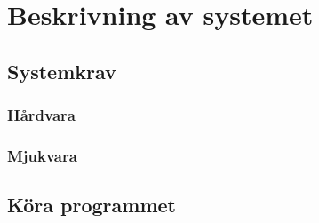 \documentclass[a4paper,12pt,oneside,final,swedish]{extarticle}
\begin{document}
\appendix

\section{Beskrivning av systemet}
\subsection{Systemkrav}
\subsubsection{Hårdvara}
\subsubsection{Mjukvara}

\subsection{Köra programmet}
\end{document}
